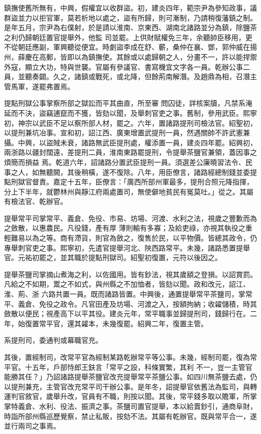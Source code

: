 \begin{pinyinscope}
 鎮撫使舊所無有，中興，假權宜以收群盜。初，建炎四年，範宗尹為參知政事，議群盜並力以拒官軍，莫若析地以處之，盜有所歸，則可漸制，乃請稍復藩鎮之制。是年五月，宗尹為右僕射，於是請以淮南、京東西、湖南北諸路並分為鎮，除鹽茶之利仍歸朝廷置官提舉外，他監
 司並罷。上供財賦權免三年，余聽帥臣移用，更不從朝廷應副，軍興聽從便宜。時劇盜李成在舒、蘄，桑仲在襄、鄧，郭仲威在揚州，薛慶在高郵，皆即以為鎮撫使。其餘或以處歸朝之人，分畫不一，許以能捍禦外寇，顯立大功，特與世襲。官屬有參議官、書寫機宜文字各一員。乾辦公事二員，並聽奏闢。久之，諸鎮或戰死，或北降，但餘荊南解潛。及趙鼎為相，召潛主管馬軍，遂罷弗置焉。



 提點刑獄公事掌察所部之獄訟而平其曲直，所至審
 問囚徒，詳核案牘，凡禁系淹延而不決，盜竊逋竄而不獲，皆劾以聞，及舉刺官吏之事。舊制，參用武臣。熙寧初，神宗以武臣不足以察所部人材，罷之。六年，置諸路提刑司檢法官。紹聖初，以提刑兼坑冶事。宣和初，詔江西、廣東增置武提刑一員，然遇關帥不許武憲兼攝。中興，以盜賊未衰，諸路無武臣提刑處，權添置一員，建炎四年罷。紹興初，兩浙路以疆封闊遠，差提刑二員，淮南東路罷提刑，令提舉茶鹽官兼領，蓋因事之煩簡而損益
 焉。乾道六年，詔諸路分置武臣提刑一員。須選差公廉曉習法令、民事之人，如無聽闕，其後稍橫，遂不復除。八年，用臣僚言，諸路經總制錢並委提點刑獄官督責。嘉定十五年，臣僚言：「廣西所部州軍最多，提刑合照元降指揮，分上下半年，就鬱林州與靜江府兩處置司，無使僻地貧民有冤莫吐。」從之。其屬有檢法官、乾辦官。



 提舉常平司掌常平、義倉、免役、市易、坊場、河渡、水利之法，視歲之豐歉而為之斂散，以惠農民。凡役錢，產有厚
 薄則輸有多寡；及給吏祿，亦視其執役之重輕難易以為之等。商有滯貨，則官為斂之，復售於民，以平物價。皆總其政令，仍專舉刺官吏之事。熙寧初，先遣官提舉河北、陜西路常平。未幾，諸路悉置提舉官。元祐初罷之，並其職於提點刑獄司。紹聖初復置，元符以後因之。



 提舉茶鹽司掌摘山煮海之利，以佐國用。皆有鈔法，視其歲額之登損。以詔賞罰。凡給之不如期，鬻之不如式，與州縣之不加恤者，皆劾以聞。政和改元，詔江、淮、荊、浙
 六路共置一員。既而諸路皆置。中興後，通置提舉常平茶鹽司，掌常平、義倉、免役之政令。凡官田產及坊場、河渡之入，按額拘納；收糴儲積，時其斂散以便民；視產高下以平其役。建炎元年，常平職事並歸提刑司，錢歸行在。二年，始復置常平官，還其糴本，未幾復罷。紹興二年，復置主管。



 系提刑司，委通判或幕職官充。



 其後，置經制司，改常平官為經制某路乾辦常平等公事。未幾，經制司罷，復為常平官。十五年，戶部恃郎王鈇言「常平之設，科條實繁，其利
 不一，豈一主管官能勝其任？」乃詔諸路提舉茶鹽官改充提舉常平茶鹽公事。如四川無茶鹽去處，仍以提刑兼充，主管官改充常平司干辦公事。是年冬，詔提舉官依舊法為監司，與轉運判官敘官，歲舉升改，官員有不職，則按以聞。其後，常平錢多取以贍軍，所掌掌特義倉、水利、役法、振濟之事。茶鹽司置官提舉，本以給賣鈔引，通商阜財，時詣所部州縣巡歷覺察，禁止私販，按劾不法。其屬有乾辦官。既與常平合一，遂並行兩司之事焉。




\end{pinyinscope}
